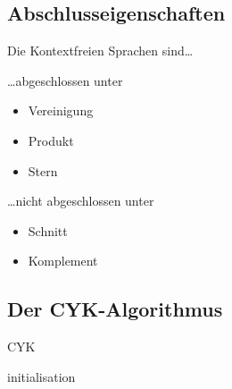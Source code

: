 \documentclass{scrartcl}
\begin{document}
\subsection*{Abschlusseigenschaften}
\begin{shaded}
Die Kontextfreien Sprachen sind\dots \\
\begin{minipage}[t]{0.48\textwidth}
\dots abgeschlossen unter
\begin{itemize}
    \item Vereinigung
    \item Produkt
    \item Stern
\end{itemize}
\end{minipage}
\hfill \vrule \hfill
\begin{minipage}[t]{0.48\textwidth}
\dots nicht abgeschlossen unter
\begin{itemize}
    \item Schnitt
    \item Komplement
\end{itemize}
\end{minipage}
\end{shaded}

\subsection*{Der CYK-Algorithmus}
\begin{algorithm}[H]
    \caption{CYK}
    \SetAlgoLined
    \LinesNumbered
    \PrintSemicolon
    initialisation\;
\end{algorithm}
\end{document}
